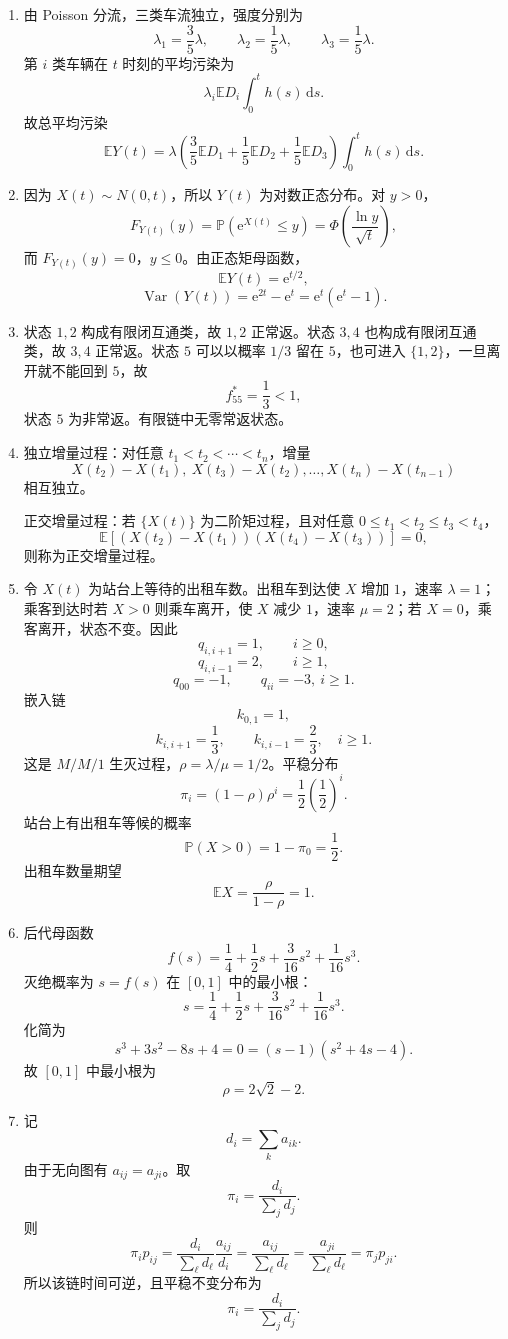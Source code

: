 \documentclass[12pt,a4paper,openany]{ctexrep}
\theoremstyle{definition}
\newcommand{\E}{\mathbb{E}}
\newcommand{\Var}{\operatorname{Var}}
\newcommand{\Pp}{\mathbb{P}}
\newcommand{\dd}{\,\mathrm{d}}
\newcommand{\e}{\mathrm{e}}
\begin{document}
\begin{enumerate}[label=\textbf{题 \arabic*:}]
	\item 由 Poisson 分流，三类车流独立，强度分别为
	\[
	\lambda_1=\frac35\lambda,\qquad
	\lambda_2=\frac15\lambda,\qquad
	\lambda_3=\frac15\lambda.
	\]
	第 $i$ 类车辆在 $t$ 时刻的平均污染为
	\[
	\lambda_i\E D_i\int_0^t h(s)\dd s.
	\]
	故总平均污染
	\[
	\E Y(t)
	=
	\lambda\left(
	\frac35\E D_1+\frac15\E D_2+\frac15\E D_3
	\right)\int_0^t h(s)\dd s.
	\]
	\item 因为 $X(t)\sim N(0,t)$，所以 $Y(t)$ 为对数正态分布。对 $y>0$，
	\[
	F_{Y(t)}(y)=\Pp(\e^{X(t)}\le y)
	=
	\Phi\left(\frac{\ln y}{\sqrt t}\right),
	\]
	而 $F_{Y(t)}(y)=0$，$y\le0$。由正态矩母函数，
	\[
	\E Y(t)=\e^{t/2},
	\]
	\[
	\Var(Y(t))=\e^{2t}-\e^t=\e^t(\e^t-1).
	\]
	\item 状态 $1,2$ 构成有限闭互通类，故 $1,2$ 正常返。状态 $3,4$ 也构成有限闭互通类，故 $3,4$ 正常返。状态 $5$ 可以以概率 $1/3$ 留在 $5$，也可进入 $\{1,2\}$，一旦离开就不能回到 $5$，故
	\[
	f_{55}^*=\frac13<1,
	\]
	状态 $5$ 为非常返。有限链中无零常返状态。
	\item 独立增量过程：对任意 $t_1<t_2<\cdots<t_n$，增量
	\[
	X(t_2)-X(t_1),\ X(t_3)-X(t_2),\dots,
	X(t_n)-X(t_{n-1})
	\]
	相互独立。

	正交增量过程：若 $\{X(t)\}$ 为二阶矩过程，且对任意 $0\le t_1<t_2\le t_3<t_4$，
	\[
	\E[(X(t_2)-X(t_1))(X(t_4)-X(t_3))]=0,
	\]
	则称为正交增量过程。
	\item 令 $X(t)$ 为站台上等待的出租车数。出租车到达使 $X$ 增加 $1$，速率 $\lambda=1$；乘客到达时若 $X>0$ 则乘车离开，使 $X$ 减少 $1$，速率 $\mu=2$；若 $X=0$，乘客离开，状态不变。因此
	\[
	q_{i,i+1}=1,\qquad i\ge0,
	\]
	\[
	q_{i,i-1}=2,\qquad i\ge1,
	\]
	\[
	q_{00}=-1,\qquad q_{ii}=-3,\ i\ge1.
	\]
	嵌入链
	\[
	k_{0,1}=1,
	\]
	\[
	k_{i,i+1}=\frac13,\qquad k_{i,i-1}=\frac23,\quad i\ge1.
	\]
	这是 $M/M/1$ 生灭过程，$\rho=\lambda/\mu=1/2$。平稳分布
	\[
	\pi_i=(1-\rho)\rho^i=\frac12\left(\frac12\right)^i.
	\]
	站台上有出租车等候的概率
	\[
	\Pp(X>0)=1-\pi_0=\frac12.
	\]
	出租车数量期望
	\[
	\E X=\frac{\rho}{1-\rho}=1.
	\]
	\item 后代母函数
	\[
	f(s)=\frac14+\frac12s+\frac3{16}s^2+\frac1{16}s^3.
	\]
	灭绝概率为 $s=f(s)$ 在 $[0,1]$ 中的最小根：
	\[
	s=\frac14+\frac12s+\frac3{16}s^2+\frac1{16}s^3.
	\]
	化简为
	\[
	s^3+3s^2-8s+4=0=(s-1)(s^2+4s-4).
	\]
	故 $[0,1]$ 中最小根为
	\[
	\rho=2\sqrt2-2.
	\]
	\item 记
	\[
	d_i=\sum_k a_{ik}.
	\]
	由于无向图有 $a_{ij}=a_{ji}$。取
	\[
	\pi_i=\frac{d_i}{\sum_jd_j}.
	\]
	则
	\[
	\pi_ip_{ij}
	=
	\frac{d_i}{\sum_\ell d_\ell}\frac{a_{ij}}{d_i}
	=
	\frac{a_{ij}}{\sum_\ell d_\ell}
	=
	\frac{a_{ji}}{\sum_\ell d_\ell}
	=
	\pi_jp_{ji}.
	\]
	所以该链时间可逆，且平稳不变分布为
	\[
	\boxed{\pi_i=\frac{d_i}{\sum_jd_j}}.
	\]
\end{enumerate}
\end{document}
